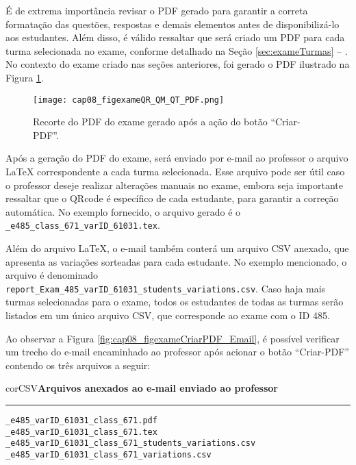 É de extrema importância revisar o PDF gerado para garantir a correta formatação das questões, respostas e demais elementos antes de disponibilizá-lo aos estudantes.
%
Além disso, é válido ressaltar que será criado um PDF para cada turma selecionada no exame, conforme detalhado na Seção \ref{sec:exameTurmas} -- . No contexto do exame criado nas seções anteriores, foi gerado o PDF ilustrado na Figura \ref{fig:cap08_figexameQR_QM_QT_PDF}. 

\begin{figure}[!ht]
  \centering
  \texttt{[image: cap08\_figexameQR\_QM\_QT\_PDF.png]}
   \caption{Recorte do PDF do exame gerado após a ação do botão ``Criar-PDF''.}
\label{fig:cap08_figexameQR_QM_QT_PDF}
\end{figure}

Após a geração do PDF do exame, será enviado por e-mail ao professor o arquivo \LaTeX{} correspondente a cada turma selecionada. Esse arquivo pode ser útil caso o professor deseje realizar alterações manuais no exame, embora seja importante ressaltar que o QRcode é específico de cada estudante, para garantir a correção automática. No exemplo fornecido, o arquivo gerado é o \verb|_e485_class_671_varID_61031.tex|. 

Além do arquivo \LaTeX{}, o e-mail também conterá um arquivo CSV anexado, que apresenta as variações sorteadas para cada estudante. No exemplo mencionado, o arquivo é denominado \verb|report_Exam_485_varID_61031_students_variations.csv|. Caso haja mais turmas selecionadas para o exame, todos os estudantes de todas as turmas serão listados em um único arquivo CSV, que corresponde ao exame com o ID 485.

Ao observar a Figura \ref{fig:cap08_figexameCriarPDF_Email}, é possível verificar um trecho do e-mail encaminhado ao professor após acionar o botão ``Criar-PDF'' contendo os três arquivos a seguir:

\begin{myboxCode}{corCSV}{\textbf{Arquivos anexados ao e-mail enviado ao professor}}\vspace{3mm}
\hrule
\begin{verbatim}
_e485_varID_61031_class_671.pdf
_e485_varID_61031_class_671.tex
_e485_varID_61031_class_671_students_variations.csv
_e485_varID_61031_class_671_variations.csv
\end{verbatim}
\end{myboxCode}
 

